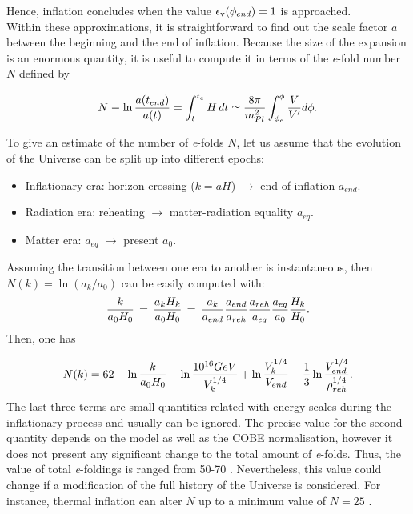 \documentclass{rmaa}
\begin{document}
\noindent
Hence, inflation concludes when the value $\epsilon_{\rm v} (\phi_{end})= 1$ is approached.
\\

Within these approximations, it is straightforward to find out the scale factor $a$ between
the beginning and the end of inflation. Because the size of the expansion is 
an enormous quantity, it is useful to compute it in terms of the 
 {\it e}-fold number $N$ defined by 
 
\begin{equation} \label{eq:N}
N \equiv \ln {a(t_{end}) \over a(t)}=
\int_{t}^{t_e}{H\,dt} \simeq 
{8\pi \over m^2_{Pl}} \int_{\phi_e}^{\phi} {V \over V'} d\phi .
\end{equation}

\noindent
To give an estimate of the number of \textit{e}-folds $N$, let us assume that the evolution of the Universe 
can be split up into different epochs:

\begin{itemize}
\item Inflationary era: horizon crossing ($k=aH$) $\to$ end of inflation $a_{end}$.
\item Radiation era: reheating $\to$ matter-radiation equality $a_{eq}$.
\item Matter era: $a_{eq}$ $\to$ present $a_{0}$.
\end{itemize}

\noindent
Assuming the transition between one era to another is instantaneous, then $N(k)= \ln ({a_k / a_0})$
can be easily computed with:
$$ 
{k\over a_0 H_0}\,=\,{a_k H_k \over a_0 H_0}\,=\,{a_k\over a_{end}}{a_{end}\over a_{reh}}
{a_{reh}\over a_{eq}}{a_{eq} \over a_0}{H_k\over H_0}.
$$
Then, one has \citep{LiddleLyth}

$$
N(k)=62-\ln{k \over a_0 H_0}-\ln{10^{16} GeV \over V_k^{1/4}}+\ln{V_k^{1/4} \over V_{end}}-
{1 \over 3}\ln{V_{end}^{1/4} \over \rho_{reh}^{1/4}}.
$$
%
The last three terms are small quantities related with energy scales during the inflationary 
process and usually can be ignored.
The precise value for the second quantity depends on the model as well as the 
COBE normalisation, however it does not present any significant change to the total 
amount of \textit{e}-folds. 
Thus, the value of total \textit{e}-foldings is ranged from 50-70 \citep{Lyth}. 
Nevertheless, this value could change if a modification of the full history of the Universe is considered. 
For instance, thermal inflation can alter $N$ up to a minimum value of $N=25$ \citep{Lyth1,Lyth2}.
\\
\end{document}
